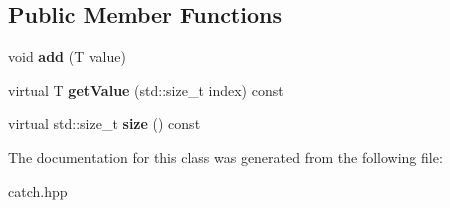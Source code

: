 \subsection*{Public Member Functions}
\begin{DoxyCompactItemize}
\item 
\mbox{\label{classCatch_1_1ValuesGenerator_a8412c8ce5d9d4fc6ff06d5246d56d538}} 
void {\bfseries add} (T value)
\item 
\mbox{\label{classCatch_1_1ValuesGenerator_a9674c8b70d562d2d68154de92dd1810a}} 
virtual T {\bfseries get\+Value} (std\+::size\+\_\+t index) const
\item 
\mbox{\label{classCatch_1_1ValuesGenerator_a9aa5b140ee502975cf35115e534ab771}} 
virtual std\+::size\+\_\+t {\bfseries size} () const
\end{DoxyCompactItemize}


The documentation for this class was generated from the following file\+:\begin{DoxyCompactItemize}
\item 
catch.\+hpp\end{DoxyCompactItemize}
